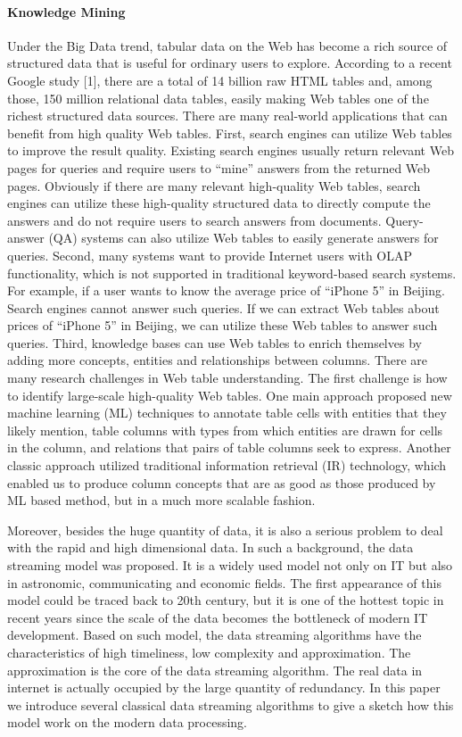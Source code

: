 \documentclass{article} %
\begin{document}
\paragraph{Knowledge Mining}Under the Big Data trend, tabular data on the Web has become a rich source of structured data that is useful for ordinary users to explore.  According to a recent Google study [1], there are a total of 14 billion raw HTML tables and, among those, 150 million relational data tables, easily making Web tables one of the richest structured data sources. There are many real-world applications that can benefit from high quality Web tables. First, search engines can utilize Web tables to improve the result quality. Existing search engines usually return relevant Web pages for queries and require users to “mine” answers from the returned Web pages. Obviously if there are many relevant high-quality Web tables, search engines can utilize these high-quality structured data to directly compute the answers and do not require users to search answers from documents. Query-answer (QA) systems can also utilize Web tables to easily generate answers for queries. Second, many systems want to provide Internet users with OLAP functionality, which is not supported in traditional keyword-based search systems. For example, if a user wants to know the average price of “iPhone 5” in Beijing. Search engines cannot answer such queries. If we can extract Web tables about prices of “iPhone 5” in Beijing, we can utilize these Web tables to answer such queries. Third, knowledge bases can use Web tables to enrich themselves by adding more concepts, entities and relationships between columns.
There are many research challenges in Web table understanding. The first challenge is how to identify large-scale high-quality Web tables. One main approach proposed new machine learning (ML) techniques to annotate table cells with entities that they likely mention, table columns with types from which entities are drawn for cells in the column, and relations that pairs of table columns seek to express. Another classic approach utilized traditional information retrieval (IR) technology, which enabled us to produce column concepts that are as good as those produced by ML based method, but in a much more scalable fashion.

Moreover, besides the huge quantity of data, it is also a serious problem to deal with the rapid and high dimensional data. In such a background, the data streaming model was proposed. It is a widely used model not only on IT but also in astronomic, communicating and economic fields. The first appearance of this model could be traced back to 20th century, but it is one of the hottest topic in recent years since the scale of the data becomes the bottleneck of modern IT development. Based on such model, the data streaming algorithms have the characteristics of high timeliness, low complexity and approximation. The approximation is the core of the data streaming algorithm. The real data in internet is actually occupied by the large quantity of redundancy. In this paper we introduce several classical data streaming algorithms to give a sketch how this model work on the modern data processing.
\end{document}
